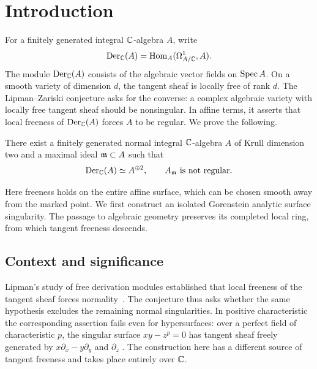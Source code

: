 \begin{abstract}
We construct a singular normal affine complex surface whose tangent
sheaf is free of rank two. This disproves the Lipman--Zariski conjecture
in characteristic zero.
\end{abstract}

\section{Introduction}

For a finitely generated integral $\mathbb C$-algebra $A$, write
\[
\operatorname{Der}_{\mathbb C}(A)=\operatorname{Hom}_A(\Omega^1_{A/\mathbb C},A).
\]
The module $\operatorname{Der}_{\mathbb C}(A)$ consists of the algebraic vector fields on
$\operatorname{Spec} A$. On a smooth variety of dimension $d$, the tangent sheaf is
locally free of rank $d$. The Lipman--Zariski conjecture asks for the
converse: a complex algebraic variety with locally free tangent sheaf
should be nonsingular. In affine terms, it asserts that local freeness
of $\operatorname{Der}_{\mathbb C}(A)$ forces $A$ to be regular. We prove the following.

\begin{theorem}\label{thm:main}
There exist a finitely generated normal integral $\mathbb C$-algebra $A$ of Krull dimension two and a maximal ideal $\mathfrak m\subset A$ such that
\[
\operatorname{Der}_{\mathbb C}(A)\simeq A^{\oplus2},
\qquad A_{\mathfrak m}\text{ is not regular}.
\]
\end{theorem}

Here freeness holds on the entire affine surface, which can be chosen
smooth away from the marked point. We first construct an isolated
Gorenstein analytic surface singularity. The passage to algebraic geometry
preserves its completed local ring, from which tangent freeness descends.

\subsection{Context and significance}

Lipman's study of free derivation modules established that local freeness
of the tangent sheaf forces normality~\cite[Theorem~3]{Lipman1965}.
The conjecture thus asks whether the same hypothesis excludes the remaining
normal singularities. In positive characteristic the corresponding assertion
fails even for hypersurfaces: over a perfect field of characteristic $p$,
the singular surface $xy-z^p=0$ has tangent sheaf freely generated by
$x\partial_x-y\partial_y$ and $\partial_z$
\cite[\S1]{GrafPositive2022}. The construction here has a different source
of tangent freeness and takes place entirely over $\mathbb C$.

